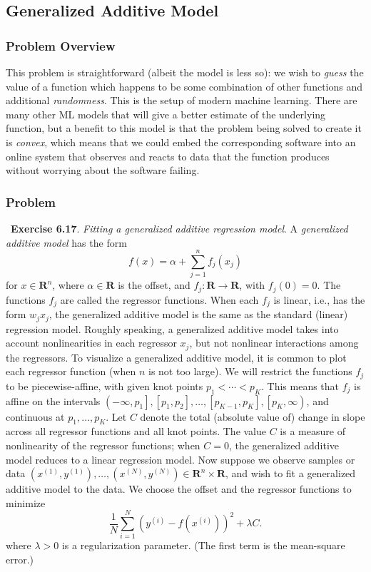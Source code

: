 \documentclass[12pt,reqno]{article}
\theoremstyle{definition}
\numberwithin{equation}{section}
\begin{document}
\newpage
\subsection{Generalized Additive Model}

\subsubsection*{Problem Overview}
This problem is straightforward (albeit the model is less so): we wish to \textit{guess} the value
of a function which happens to be some combination of other functions and additional \textit{randomness}.
This is the setup of modern machine learning. There are many other ML models that will
give a better estimate of the underlying function, but a benefit to this model is that
the problem being solved to create it is \textit{convex}, which means that we could embed the corresponding software
into an online system that observes and reacts to data that the function produces without worrying about
the software failing. 

\subsubsection*{Problem}
~\cite{EE364a-extra}\textbf{Exercise 6.17}. \textit{Fitting a generalized additive regression model}.
A \textit{generalized additive model} has the form
\[
f(x)=\alpha+\sum_{j=1}^n f_j\left(x_j\right)
\]
for $x \in \mathbf{R}^n$, where $\alpha \in \mathbf{R}$ is the offset, and $f_j: \mathbf{R} \rightarrow \mathbf{R}$, with $f_j(0)=0$.
The functions $f_j$ are called the regressor functions. When each $f_j$ is linear, i.e., has the form $w_j x_j$,
the generalized additive model is the same as the standard (linear) regression model.
Roughly speaking, a generalized additive model takes into account nonlinearities in each regressor $x_j$, but not nonlinear interactions among the regressors.
To visualize a generalized additive model, it is common to plot each regressor function (when $n$ is not too large).
We will restrict the functions $f_j$ to be piecewise-affine, with given knot points $p_1<\cdots<p_K$. This means that $f_j$ is affine on the intervals
$\left(-\infty, p_1\right],\left[p_1, p_2\right], \ldots,\left[p_{K-1}, p_K\right],\left[p_K, \infty\right)$, and continuous at $p_1, \ldots, p_K$.
Let $C$ denote the total (absolute value of) change in slope across all regressor functions and all knot points.
The value $C$ is a measure of nonlinearity of the regressor functions; when $C=0$, the generalized additive model reduces to a linear regression model.
Now suppose we observe samples or data $\left(x^{(1)}, y^{(1)}\right), \ldots,\left(x^{(N)}, y^{(N)}\right) \in \mathbf{R}^n \times \mathbf{R}$,
and wish to fit a generalized additive model to the data. We choose the offset and the regressor functions to minimize
\[
\frac{1}{N} \sum_{i=1}^N\left(y^{(i)}-f(x^{(i)})\right)^2+\lambda C.
\]
where $\lambda>0$ is a regularization parameter. (The first term is the mean-square error.)
\end{document}
